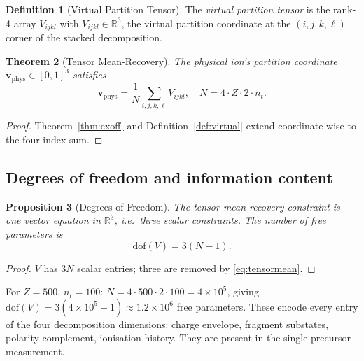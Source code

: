 \documentclass[twocolumn,10pt,a4paper]{article}
\theoremstyle{thmstyle}
\newtheorem{theorem}{Theorem}[section]
\newtheorem{proposition}[theorem]{Proposition}
\theoremstyle{definition}
\newtheorem{definition}[theorem]{Definition}
\theoremstyle{remark}
\newcommand{\R}{\mathbb{R}}
\begin{document}
\begin{definition}[Virtual Partition Tensor]
\label{def:tensor}
The \emph{virtual partition tensor} is the rank-4 array
$V_{ijkl}$ with $V_{ijkl}\in\R^{3}$, the virtual partition
coordinate at the $(i,j,k,\ell)$ corner of the stacked decomposition.
\end{definition}

\begin{theorem}[Tensor Mean-Recovery]
\label{thm:tensor}
The physical ion's partition coordinate
$\mathbf v_{\mathrm{phys}}\in[0,1]^{3}$ satisfies
\begin{equation}
\mathbf v_{\mathrm{phys}}=\frac{1}{N}\sum_{i,j,k,\ell}V_{ijkl},
\quad N=4\cdot Z\cdot 2\cdot n_{t}.
\label{eq:tensormean}
\end{equation}
\end{theorem}

\begin{proof}
Theorem~\ref{thm:exoff} and Definition~\ref{def:virtual} extend
coordinate-wise to the four-index sum.
\end{proof}

\subsection{Degrees of freedom and information content}

\begin{proposition}[Degrees of Freedom]
\label{prop:dof}
The tensor mean-recovery constraint is one vector equation in
$\R^{3}$, i.e.\ three scalar constraints. The number of free
parameters is
\begin{equation}
\mathrm{dof}(V)=3(N-1).
\label{eq:dof}
\end{equation}
\end{proposition}

\begin{proof}
$V$ has $3N$ scalar entries; three are removed by \eqref{eq:tensormean}.
\end{proof}

\begin{example}
For $Z=500$, $n_{t}=100$:
$N=4\cdot 500\cdot 2\cdot 100=4\times 10^{5}$, giving
$\mathrm{dof}(V)=3(4\times 10^{5}-1)\approx 1.2\times 10^{6}$ free
parameters. These encode every entry of the four decomposition
dimensions: charge envelope, fragment substates, polarity complement,
ionisation history. They are present in the single-precursor measurement.
\end{example}
\end{document}
